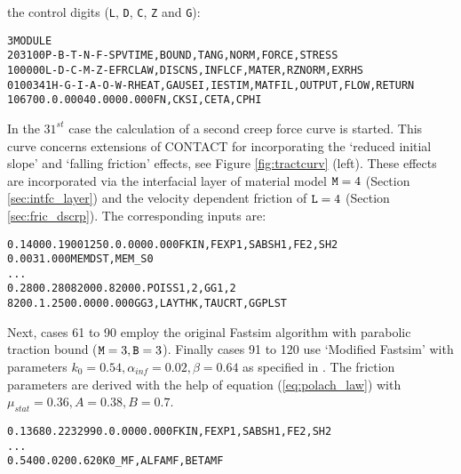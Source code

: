 \documentclass[12pt]{report}
\begin{document}
the control digits ({\tt L}, {\tt D}, {\tt C}, {\tt Z} and {\tt G}):
\begin{alltt}\small
 3 MODULE
  203100     P-B-T-N-F-S        PVTIME, BOUND , TANG  , NORM , FORCE, STRESS
  100000     L-D-C-M-Z-E        FRCLAW, DISCNS, INFLCF, MATER, RZNORM, EXRHS
 0100341   H-G-I-A-O-W-R  HEAT, GAUSEI, IESTIM, MATFIL, OUTPUT, FLOW, RETURN
 106700.      0.0004     0.000      0.000           FN, CKSI, CETA, CPHI
\end{alltt}
In the $31^{st}$ case the calculation of a second creep force curve is
started. This curve concerns extensions of CONTACT for incorporating the
`reduced initial slope' and `falling friction' effects, see Figure
\ref{fig:tractcurv} (left). These effects are incorporated via the
interfacial layer of material model ${\tt M}=4$ (Section
\ref{sec:intfc_layer}) and the velocity dependent friction of ${\tt L}=4$
(Section \ref{sec:fric_dscrp}). The corresponding inputs are:
\begin{alltt}\small
% Exponential falling friction (L=4):
   0.1400     0.1900     1250.    0.000   0.000  FKIN, FEXP1,SABSH1,FE2,SH2
   0.003      1.000                              MEMDST, MEM_S0
...
% Elastic bodies with elasto-plastic interface layer (M=4):
   0.280      0.280      82000.   82000.         POISS 1,2,  GG 1,2
   8200.      1.250      0.000    0.000          GG3, LAYTHK, TAUCRT, GGPLST
\end{alltt}
Next, cases 61 to 90 employ the original Fastsim algorithm with parabolic
traction bound (${\tt M}=3, {\tt B}=3$). Finally cases 91 to 120 use
`Modified Fastsim' with parameters $k_0=0.54, \alpha_{inf}=0.02,
\beta=0.64$ as specified in \cite{Spiryagin2013}. The friction
parameters are derived with the help of equation (\ref{eq:polach_law})
with $\mu_{stat}=0.36, A=0.38, B=0.7$.
\begin{alltt}\small
% Exponential falling friction (L=4), static 0.36(!):
   0.1368     0.2232      990.   0.000   0.000   FKIN, FEXP1,SABSH1,FE2,SH2
...
% Slope reduction for Modified Fastsim algorithm (M=3):
   0.540      0.020      0.620                   K0\_MF,ALFAMF,BETAMF
\end{alltt}
\end{document}
